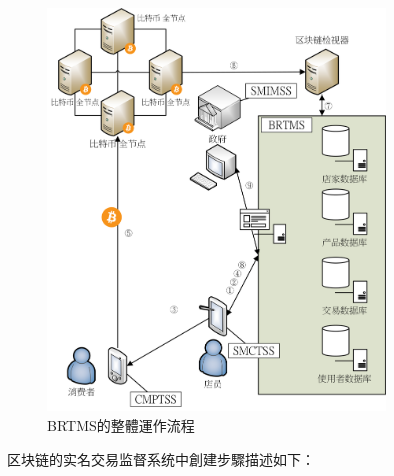	\begin{figure}[h]
		\centering
		\includegraphics[width = 0.8\textwidth]{fig4.png}
		\caption{BRTMS的整體運作流程}\label{fig4}
	\end{figure}
	区块链的实名交易监督系统中創建步驟描述如下：

